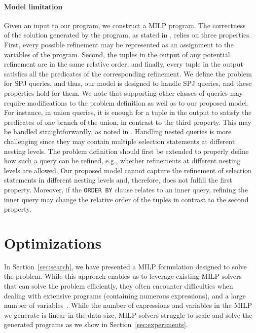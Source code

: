 \paragraph*{\textbf{Model limitation}}
\label{sec:query_class_lims}
Given an input to our program, we construct a MILP program. The correctness of the solution generated by the program, as stated in , relies on three properties. First, every possible refinement may be represented as an assignment to the variables of the program. Second, the tuples in the output of any potential refinement are in the same relative order, and finally, every tuple in the output satisfies all the predicates of the corresponding refinement. We define the problem for SPJ queries, and thus, our model is designed to handle SPJ queries, and these properties hold for them. We note that supporting other classes of queries may require modifications to the problem definition as well as to our proposed model. For instance, in union queries, it is enough for a tuple in the output to satisfy the predicates of one branch of the union, in contrast to the third property. This may be handled straightforwardly, as noted in . Handling nested queries is more challenging since they may contain multiple selection statements at different nesting levels. The problem definition should first be extended to properly define how such a query can be refined, e.g., whether refinements at different nesting levels are allowed. Our proposed model cannot capture the refinement of selection statements in different nesting levels and, therefore, does not fulfill the first property. Moreover, if the {\tt ORDER BY} clause relates to an inner query, refining the inner query may change the relative order of the tuples in contrast to the second property.










\section{Optimizations}
\label{sec:optimizations}
In Section~\ref{sec:search}, we have presented a MILP formulation designed to solve the \problem{} problem. While this approach enables us to leverage existing MILP solvers that can solve the problem efficiently, they often encounter difficulties when dealing with extensive programs (containing numerous expressions), and a large number of variables~\cite{QFix}. While the number of expressions and variables in the MILP we generate is linear in the data size, MILP solvers struggle to scale and solve the generated programs as we show in Section~\ref{sec:experiments}. %



